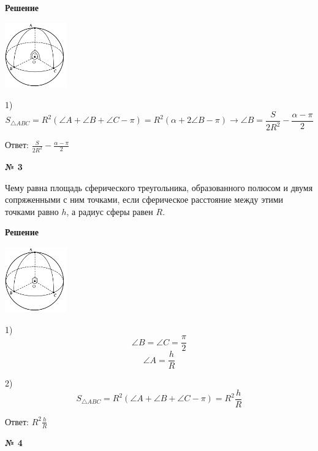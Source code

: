     \textbf{Решение}\\

    \begin{center}
        \includegraphics[width=0.2\textwidth]{images/img4}\\
    \end{center}

    1)
    \[
        S_{\triangle ABC} = R^2(\angle A + \angle B + \angle C - \pi) =  R^2(\alpha + 2\angle B - \pi)\rightarrow
        \angle B = \frac{S}{2R^2} - \frac{\alpha- \pi}{2}
    \]

    Ответ: $\frac{S}{2R^2} - \frac{\alpha- \pi}{2} $

    \begin{center}
        \textbf{№ 3}
    \end{center}

    Чему равна площадь сферического треугольника, образованного полюсом и двумя сопряженными с ним точками,
    если сферическое расстояние между этими точками равно $h$, а радиус сферы равен $R$.

    \textbf{Решение}\\

    \begin{center}
        \includegraphics[width=0.2\textwidth]{images/img5}\\
    \end{center}

    1)
    \[
        \angle B = \angle C = \frac{\pi}{2}
    \]
    \[
        \angle A = \frac{h}{R}
    \]

    2) \[
           S_{\triangle ABC} = R^2(\angle A + \angle B + \angle C - \pi) = R^2\frac{h}{R}
    \]

    Ответ: $R^2\frac{h}{R}$

    \begin{center}
        \textbf{№ 4}
    \end{center}


